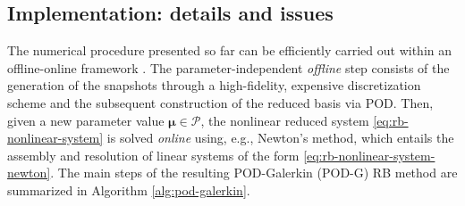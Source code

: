 \documentclass[12pt, a4paper, twoside, openright, notitlepage]{report}
\numberwithin{equation}{chapter}
\theoremstyle{theorem}
\theoremstyle{definition}
\theoremstyle{remark}
\theoremstyle{proposition}
\numberwithin{figure}{chapter}
\newcommand{\bg}[1]{\boldsymbol{#1}}
\begin{document}
	\vspace*{0.01cm}
		
	\subsection{Implementation: details and issues}
	\label{section:Implementation}
	
		The numerical procedure presented so far can be efficiently carried out within an offline-online framework \cite{Pru02}. The parameter-independent \emph{offline} step consists of the generation of the snapshots through a high-fidelity, expensive discretization scheme and the subsequent construction of the reduced basis via POD. Then, given a new parameter value $\bg{\mu} \in \mathcal{P}$, the nonlinear reduced system \eqref{eq:rb-nonlinear-system} is solved \emph{online} using, e.g., Newton's method, which entails the assembly and resolution of linear systems of the form \eqref{eq:rb-nonlinear-system-newton}. The main steps of the resulting POD-Galerkin (POD-G) RB method are summarized in Algorithm \ref{alg:pod-galerkin}.
		
		\algrenewcommand\textproc{}
		
\end{document}
